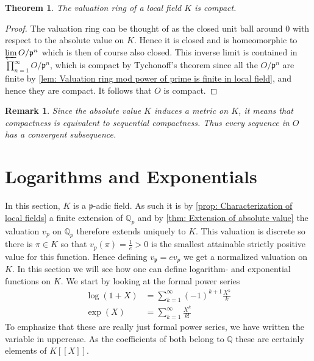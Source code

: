 \documentclass{article}
\newtheorem{theorem}{Theorem}[section]
\newtheorem{remark}{Remark}[section]
\newcommand{\mfrak}[1]{\mathfrak{#1}}
\newcommand{\mbb}[1]{\mathbb{#1}}
\newcommand{\vp}{{v_{\mfrak p}}}
\begin{document}
\begin{theorem} \label{thm: Valuation ring in local field is compact}
    The valuation ring of a local field $K$ is compact.
\end{theorem}
\begin{proof}
    The valuation ring can be thought of as the closed unit ball around 0 with respect to the absolute value on $K$. Hence it is closed and is homeomorphic to $\varprojlim O / \mfrak p^n$ which is then of course also closed. This inverse limit is contained in $\prod_{n = 1}^\infty O / \mfrak p^n$, which is compact by Tychonoff's theorem since all the $O / \mfrak p^n$ are finite by \cref{lem: Valuation ring mod power of prime is finite in local field}, and hence they are compact. It follows that $O$ is compact.
\end{proof}
\begin{remark}\label{rem: Compactness is equivalent to sequential compactness}
    Since the absolute value $K$ induces a metric on $K$, it means that compactness is equivalent to sequential compactness. Thus every sequence in $O$ has a convergent subsequence.
\end{remark}



\section{Logarithms and Exponentials}
In this section, $K$ is a $\mfrak p$-adic field. As such it is by \cref{prop: Characterization of local fields} a finite extension of $\mbb Q_p$ and by \cref{thm: Extension of absolute value} the valuation $v_p$ on $\mbb Q_p$ therefore extends uniquely to $K$. This valuation is discrete so there is $\pi \in K$ so that $v_p(\pi) = \frac{1}{e} > 0$ is the smallest attainable strictly positive value for this function. Hence defining $\vp = e v_p$ we get a normalized valuation on $K$. In this section we will see how one can define logarithm- and exponential functions on $K$. We start by looking at the formal power series 
\begin{align*}
    \log(1+X) &= \sum_{k = 1}^\infty (-1)^{k+1}\frac{X^k}{k} \\
    \exp(X) &= \sum_{k = 1}^\infty \frac{X^k}{k!} 
\end{align*}
To emphasize that these are really just formal power series, we have written the variable in uppercase. As the coefficients of both belong to $\mbb Q$ these are certainly elements of $K[[X]]$.
\end{document}
